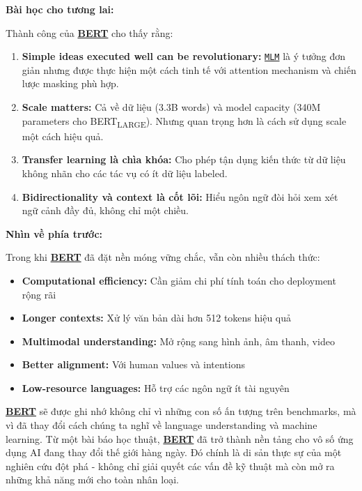     \textbf{Bài học cho tương lai:}
    
    Thành công của \hyperref[acro:bert]{\textbf{BERT}} cho thấy rằng:
    \begin{enumerate}
        \item \textbf{Simple ideas executed well can be revolutionary:} \hyperref[acro:mlm]{\texttt{MLM}} là ý tưởng đơn giản nhưng được thực hiện một cách tinh tế với attention mechanism và chiến lược masking phù hợp.
        
        \item \textbf{Scale matters:} Cả về dữ liệu (3.3B words) và model capacity (340M parameters cho BERT\textsubscript{LARGE}). Nhưng quan trọng hơn là cách sử dụng scale một cách hiệu quả.
        
        \item \textbf{Transfer learning là chìa khóa:} Cho phép tận dụng kiến thức từ dữ liệu không nhãn cho các tác vụ có ít dữ liệu labeled.
        
        \item \textbf{Bidirectionality và context là cốt lõi:} Hiểu ngôn ngữ đòi hỏi xem xét ngữ cảnh đầy đủ, không chỉ một chiều.
    \end{enumerate}
    
    \textbf{Nhìn về phía trước:}
    
    Trong khi \hyperref[acro:bert]{\textbf{BERT}} đã đặt nền móng vững chắc, vẫn còn nhiều thách thức:
    \begin{itemize}
        \item \textbf{Computational efficiency:} Cần giảm chi phí tính toán cho deployment rộng rãi
        \item \textbf{Longer contexts:} Xử lý văn bản dài hơn 512 tokens hiệu quả
        \item \textbf{Multimodal understanding:} Mở rộng sang hình ảnh, âm thanh, video
        \item \textbf{Better alignment:} Với human values và intentions
        \item \textbf{Low-resource languages:} Hỗ trợ các ngôn ngữ ít tài nguyên
    \end{itemize}
    
    \hyperref[acro:bert]{\textbf{BERT}} sẽ được ghi nhớ không chỉ vì những con số ấn tượng trên benchmarks, mà vì đã thay đổi cách chúng ta nghĩ về language understanding và machine learning. Từ một bài báo học thuật, \hyperref[acro:bert]{\textbf{BERT}} đã trở thành nền tảng cho vô số ứng dụng AI đang thay đổi thế giới hàng ngày. Đó chính là di sản thực sự của một nghiên cứu đột phá - không chỉ giải quyết các vấn đề kỹ thuật mà còn mở ra những khả năng mới cho toàn nhân loại.